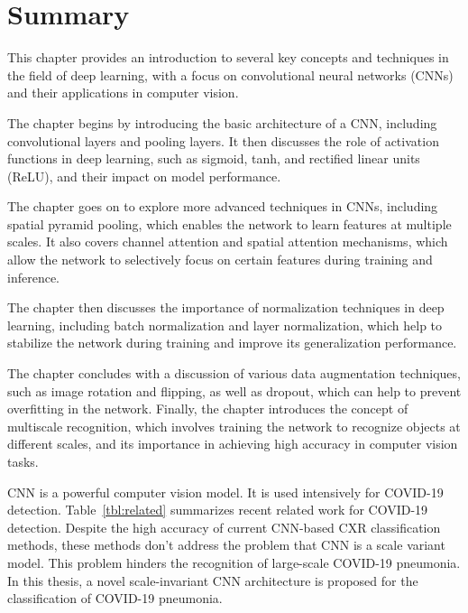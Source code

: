 

\section{Summary}
This chapter provides an introduction to several key concepts and techniques in the field of deep learning, with a focus on convolutional neural networks (CNNs) and their applications in computer vision.

The chapter begins by introducing the basic architecture of a CNN, including convolutional layers and pooling layers. It then discusses the role of activation functions in deep learning, such as sigmoid, tanh, and rectified linear units (ReLU), and their impact on model performance.

The chapter goes on to explore more advanced techniques in CNNs, including spatial pyramid pooling, which enables the network to learn features at multiple scales. It also covers channel attention and spatial attention mechanisms, which allow the network to selectively focus on certain features during training and inference.

The chapter then discusses the importance of normalization techniques in deep learning, including batch normalization and layer normalization, which help to stabilize the network during training and improve its generalization performance.

The chapter concludes with a discussion of various data augmentation techniques, such as image rotation and flipping, as well as dropout, which can help to prevent overfitting in the network. Finally, the chapter introduces the concept of multiscale recognition, which involves training the network to recognize objects at different scales, and its importance in achieving high accuracy in computer vision tasks.


CNN is a powerful computer vision model. It is used intensively for COVID-19 detection. Table~\ref{tbl:related} summarizes recent related work for COVID-19 detection. Despite the high accuracy of current CNN-based CXR classification methods, these methods don't address the problem that CNN is a scale variant model. This problem hinders the recognition of large-scale COVID-19 pneumonia. In this thesis, a novel scale-invariant CNN architecture is proposed for the classification of COVID-19 pneumonia.